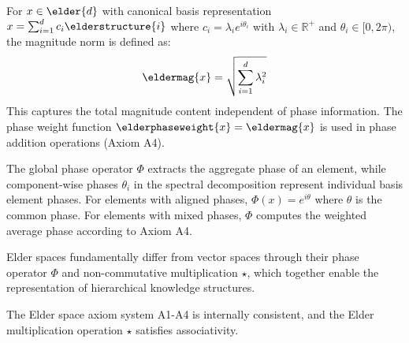 \begin{definition}
\label{def:elder_magnitude_norm}
For $x \in \elder{d}$ with canonical basis representation $x = \sum_{i=1}^{d} c_i \elderstructure{i}$ where $c_i = \lambda_i e^{i\theta_i}$ with $\lambda_i \in \mathbb{R}^+$ and $\theta_i \in [0, 2\pi)$, the magnitude norm is defined as:
\begin{equation}
\eldermag{x} = \sqrt{\sum_{i=1}^{d} \lambda_i^2}
\end{equation}
This captures the total magnitude content independent of phase information. The phase weight function $\elderphaseweight{x} = \eldermag{x}$ is used in phase addition operations (Axiom A4).
\end{definition}

\begin{remark}
The global phase operator $\Phi$ extracts the aggregate phase of an element, while component-wise phases $\theta_i$ in the spectral decomposition represent individual basis element phases. For elements with aligned phases, $\Phi(x) = e^{i\theta}$ where $\theta$ is the common phase. For elements with mixed phases, $\Phi$ computes the weighted average phase according to Axiom A4.
\end{remark}

Elder spaces fundamentally differ from vector spaces through their phase operator $\Phi$ and non-commutative multiplication $\star$, which together enable the representation of hierarchical knowledge structures.

\begin{theorem}
\label{thm:axiom_consistency}
The Elder space axiom system A1-A4 is internally consistent, and the Elder multiplication operation $\star$ satisfies associativity.
\end{theorem}

